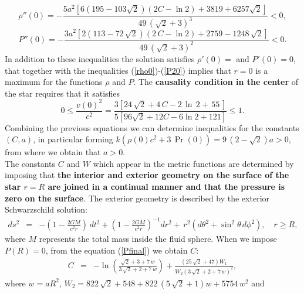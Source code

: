 \documentclass[12pt,onecolumn,a4paper]{article}
\begin{document}
\begin{equation}
\rho''(0) =-{\frac {5 {a}^{2} \left[ 6\left( 195-103\sqrt {2}
 \right)  \left( 2 C-\ln 2  \right) +3819+6257 \sqrt {2} \right] }{49\, \left( \sqrt {2}+3 \right) ^{3}}}<0,
\end{equation}
\begin{equation}
\!\!P''(0)=-{\frac {3 {a}^{2} \left[ 2\left( 113-72\,\sqrt {2}
 \right)  \left( 2\,C-\ln2  \right) +2759-1248\,
\sqrt {2} \right] }{49\, \left( \sqrt {2}+3 \right) ^{2}}}
 <0.
 \label{P20}
\end{equation}
In addition to these inequalities the solution satisfies $\rho'(0)=$ and $P'(0)=0$, that together with the inequalities (\ref{rho0})-(\ref{P20}) implies that $r=0$ is a maximum for the functions $\rho$ and $P$. 
The {\bf causality condition in the center} of the star requires that it satisfies
\begin{equation}
\!\!0\leq\frac{v(0)^2}{c^2}%
={
\frac {3[24\,\sqrt {2}+4\,C-2\,\ln \, 2 +\,55\,]}{5[96\sqrt {2}+12C-6\ln 2   +121]}}\leq 1.\label{v0}
\end{equation}
Combining the previous equations we can determine inequalities for the constants  $(C,a)$, in particular
forming $k \left( \rho \left( 0 \right) {c}^{2}+3\,\Pr \left( 0 \right)  \right) =9\, \left( 2-\sqrt {2} \right) a
>0$, from where we obtain that $a>0$. \\
\noindent
The constants $C$ and $W$ which appear in the metric functions are determined by imposing that {\bf the interior and exterior geometry on the surface of the star $r=R$ are joined in a continual manner and that the pressure is zero on the surface}. The exterior geometry is described by the exterior Schwarzschild solution:
\begin{eqnarray}
ds^2\! &\!=\!&-\left(1-\frac{2GM}{c^2r}\right)\,dt^2+\left(1-\frac{2GM}{c^2r}\right)^{-1}dr^2
+\,r^2 (d\theta ^2+\sin ^2{\theta}\,d\phi ^2),
\quad r\geq R,
\nonumber
 \end{eqnarray}
where $M$ represents the total mass inside the fluid sphere.  When we impose $P(R)=0$, from the equation (\ref{Pfinal}) we obtain $C$:  
\begin{eqnarray}
C&=&-\ln  \left( {\frac {\sqrt {2}+3+7\,w}{3\,\sqrt {2}+2+7\,w}}
 \right) +{\frac { \left( 25\,\sqrt {2}+47 \right)  W_1  }{ W_2  \left( 3\,\sqrt {2}+2+7\,w \right) ^{2}}},
\label{Ccondicion}
\end{eqnarray}
where $w=aR^2$, $
W_2=%
822
\,\sqrt {2}+548+822\, \left( 5\,\sqrt {2}+1 \right) w+5754\,{w}^{2}
$ and 
\end{document}
